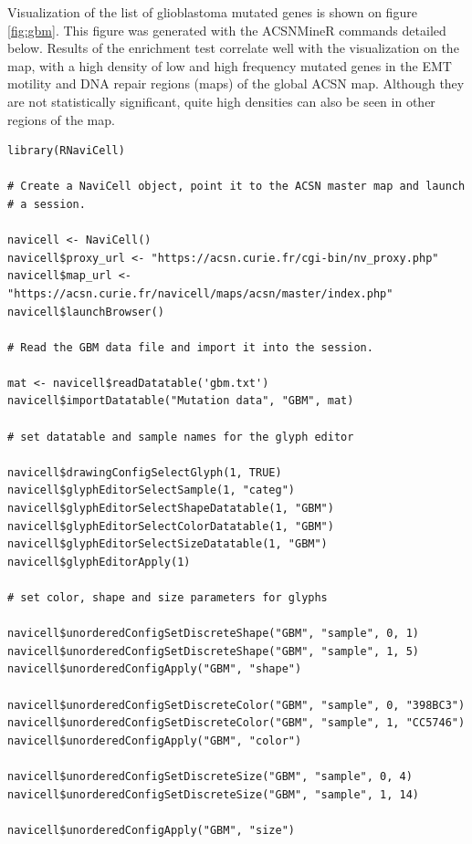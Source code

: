 \documentclass{article}
\begin{document}
Visualization of the list of glioblastoma mutated genes is shown on figure
\ref{fig:gbm}. This figure was generated with the ACSNMineR commands detailed
below. Results of the enrichment test correlate well with the visualization on
the map, with a high density of low and high frequency mutated genes in the EMT
motility and DNA repair regions (maps) of the global ACSN map. Although they
are not statistically significant, quite high densities can also be seen in
other regions of the map.

\begin{verbatim}
library(RNaviCell)

# Create a NaviCell object, point it to the ACSN master map and launch
# a session.

navicell <- NaviCell()
navicell$proxy_url <- "https://acsn.curie.fr/cgi-bin/nv_proxy.php"
navicell$map_url <- "https://acsn.curie.fr/navicell/maps/acsn/master/index.php"
navicell$launchBrowser()

# Read the GBM data file and import it into the session.

mat <- navicell$readDatatable('gbm.txt')
navicell$importDatatable("Mutation data", "GBM", mat)

# set datatable and sample names for the glyph editor

navicell$drawingConfigSelectGlyph(1, TRUE)
navicell$glyphEditorSelectSample(1, "categ")
navicell$glyphEditorSelectShapeDatatable(1, "GBM")
navicell$glyphEditorSelectColorDatatable(1, "GBM")
navicell$glyphEditorSelectSizeDatatable(1, "GBM")
navicell$glyphEditorApply(1)

# set color, shape and size parameters for glyphs

navicell$unorderedConfigSetDiscreteShape("GBM", "sample", 0, 1)
navicell$unorderedConfigSetDiscreteShape("GBM", "sample", 1, 5)
navicell$unorderedConfigApply("GBM", "shape")

navicell$unorderedConfigSetDiscreteColor("GBM", "sample", 0, "398BC3")
navicell$unorderedConfigSetDiscreteColor("GBM", "sample", 1, "CC5746")
navicell$unorderedConfigApply("GBM", "color")

navicell$unorderedConfigSetDiscreteSize("GBM", "sample", 0, 4)
navicell$unorderedConfigSetDiscreteSize("GBM", "sample", 1, 14)

navicell$unorderedConfigApply("GBM", "size")
\end{verbatim}
\end{document}
